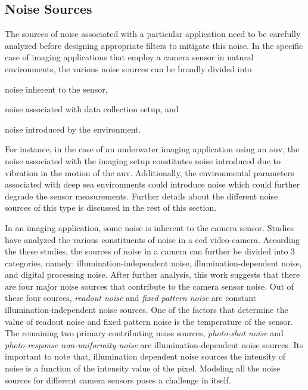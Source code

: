 \subsection{Noise Sources}
\label{sec:noise_sources}

The sources of noise associated with a particular  application need to be carefully analyzed before designing appropriate filters to mitigate this noise.
In the specific case of imaging applications that employ a camera sensor in natural environments, the various noise sources can be broadly divided
into \begin{enumerate*}[label=(\roman*)] \item noise inherent to the sensor, \item noise associated with data collection setup, and \item noise introduced by the environment. \end{enumerate*} For instance, in the case of an underwater imaging application using an \gls{auv}, the noise associated with the imaging setup constitutes noise introduced due to vibration in the motion of the \gls{auv}. Additionally, the environmental parameters associated with deep sea environments could introduce noise which could further degrade the sensor measurements. Further details about the different noise sources of this type is discussed in the rest of this section.

In an imaging application, some noise is inherent to the camera sensor. Studies \cite{irie} have analyzed the various constituents of noise 
in a \gls{ccd} video-camera. According the these studies, the sources of noise in a camera can further be divided into 3 categories, namely: illumination-independent noise, illumination-dependent noise, and digital processing noise. After further analysis, this work suggests that there are four major noise sources that contribute to the camera sensor noise. Out of these four sources, \emph{readout noise} and \emph{fixed pattern noise} are constant illumination-independent noise sources. One of the factors that determine the value of readout noise and fixed pattern noise is the temperature of the sensor. The remaining two primary contributing noise sources, \emph{photo-shot noise} and \emph{photo-response non-uniformity noise} are illumination-dependent noise sources. Its important to note that, illumination dependent noise sources the intensity of noise is a function of the intensity value of the pixel. Modeling all the noise sources for different camera sensors poses a challenge in itself.

